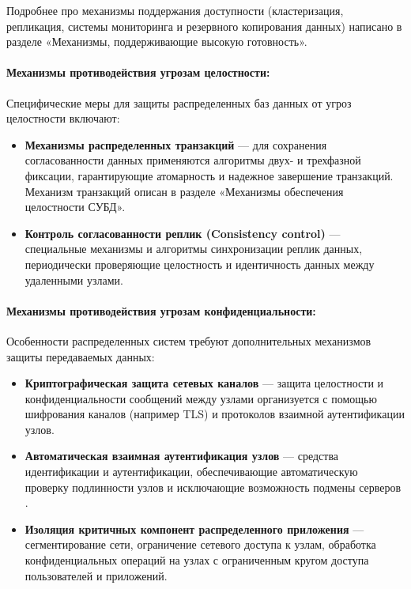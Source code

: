 Подробнее про механизмы поддержания доступности (кластеризация, репликация, системы мониторинга и резервного копирования данных) написано в разделе «Механизмы, поддерживающие высокую готовность».

\paragraph{Механизмы противодействия угрозам целостности:}

Специфические меры для защиты распределенных баз данных от угроз целостности включают:

\begin{itemize} 
    \item \textbf{Механизмы распределенных транзакций} — для сохранения согласованности данных применяются алгоритмы двух- и трехфазной фиксации, гарантирующие атомарность и надежное завершение транзакций. Механизм транзакций описан в разделе «Механизмы обеспечения целостности СУБД».
    \item \textbf{Контроль согласованности реплик (Consistency control)} — специальные механизмы и алгоритмы синхронизации реплик данных, периодически проверяющие целостность и идентичность данных между удаленными узлами.
\end{itemize}

\paragraph{Механизмы противодействия угрозам конфиденциальности:}

Особенности распределенных систем требуют дополнительных механизмов защиты передаваемых данных:

\begin{itemize} 
    \item \textbf{Криптографическая защита сетевых каналов} — защита целостности и конфиденциальности сообщений между узлами организуется с помощью шифрования каналов (например TLS) и протоколов взаимной аутентификации узлов.
    \item \textbf{Автоматическая взаимная аутентификация узлов} — средства идентификации и аутентификации, обеспечивающие автоматическую проверку подлинности узлов и исключающие возможность подмены серверов \cite{Karpova2009}.
    \item \textbf{Изоляция критичных компонент распределенного приложения} — сегментирование сети, ограничение сетевого доступа к узлам, обработка конфиденциальных операций на узлах с ограниченным кругом доступа пользователей и приложений.
\end{itemize}

